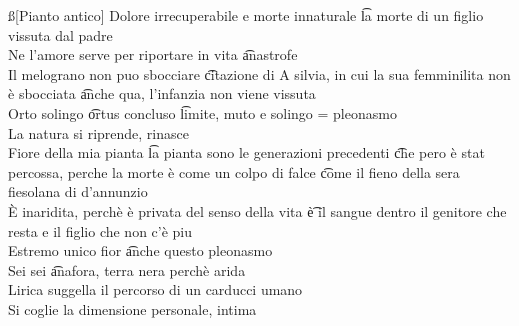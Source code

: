 \documentclass[12pt]{article}
\begin{document}
\ss[Pianto antico]
Dolore irrecuperabile e morte innaturale \t la morte di un figlio vissuta dal padre \\
Ne l'amore serve per riportare in vita \t anastrofe \\
Il melograno non puo sbocciare \t citazione di A silvia, in cui la sua femminilita non è sbocciata \t anche qua, l'infanzia non viene vissuta \\
Orto solingo \t ortus concluso \t limite, muto e solingo = pleonasmo \\
La natura si riprende, rinasce \\
Fiore della mia pianta \t la pianta sono le generazioni precedenti \t che pero è stat percossa, perche la morte è come un colpo di falce \t come il fieno della sera fiesolana di d'annunzio \\
È inaridita, perchè è privata del senso della vita \t è il sangue dentro il genitore che resta e il figlio che non c'è piu \\
Estremo unico fior \t anche questo pleonasmo \\
Sei sei \t anafora, terra nera perchè arida \\
Lirica suggella il percorso di un carducci umano \\
Si coglie la dimensione personale, intima
\end{document}

